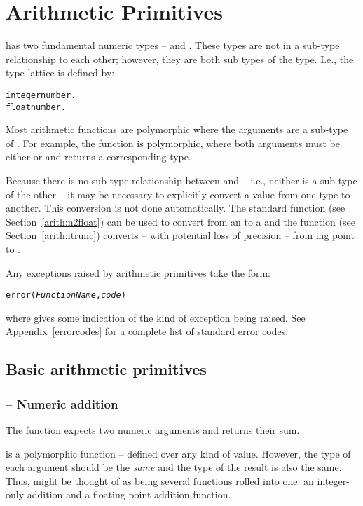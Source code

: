 \chapter{Arithmetic Primitives}

\go has two fundamental numeric types --  and . These types are not in a sub-type relationship to each other; however, they are both sub types of the  type. I.e., the type lattice is defined by:
\begin{alltt}
integer\impl{}number.
float\impl{}number.
\end{alltt}
Most arithmetic functions are polymorphic where the arguments are a sub-type of . For example, the \q{+} function is polymorphic, where both arguments must be either  or  and returns a corresponding type.

Because there is no sub-type relationship between  and  -- i.e., neither is a sub-type of the other -- it may be necessary to explicitly convert a value from one type to another. This conversion is not done automatically. The standard  function (see Section~\vref{arith:n2float}) can be used to convert from an  to a  and the  function (see Section~\vref{arith:itrunc}) converts -- with potential loss of precision -- from ing point to .


Any exceptions raised by arithmetic primitives take the form:
\begin{alltt}
error(\emph{FunctionName},\emph{code})
\end{alltt}
where  gives some indication of the kind of exception being raised. See Appendix~\vref{errorcodes} for a complete list of standard error codes.

\section{Basic arithmetic primitives}
\label{arith:basic}

\subsection{\function{+} -- Numeric addition}
The \function{+} function expects two numeric arguments and returns their sum. 

\q{+} is a polymorphic function -- defined over any kind of  value. However, the type of each argument should be the \emph{same} and the type of the result is also the same. Thus, \q{+} might be thought of as being several functions rolled into one: an integer-only addition and a floating point addition function.

